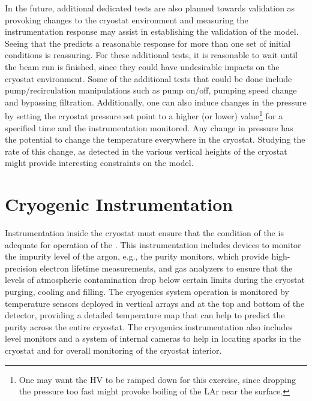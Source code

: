 In the future, additional dedicated tests are also planned towards  validation as provoking changes to the cryostat environment and measuring the instrumentation response may assist in establishing the validation of the  model. Seeing that the  predicts a reasonable response for more than one set of initial conditions is reassuring. For these additional tests, it is reasonable to wait until the beam run is finished, since they could have undesirable impacts on the cryostat environment. Some of the additional tests that could be done include pump/recirculation manipulations such as pump on/off, pumping speed change and bypassing filtration. Additionally, one can also induce changes in the pressure by setting the cryostat pressure set point to a higher (or lower) value\footnote{One may want the HV to be ramped down for this exercise, since dropping the pressure too fast might provoke boiling of the LAr near the
surface.} for a specified time and the instrumentation monitored. Any change in pressure has the potential to change the temperature everywhere in the cryostat. Studying the rate of this change, as
detected in the various vertical heights of the cryostat might provide interesting constraints on the  model. 


\section{Cryogenic Instrumentation}
\label{sec:fdgen-cryo-instr}
Instrumentation inside the cryostat must ensure that the condition of the  is adequate for operation of the .
This instrumentation includes devices to monitor the impurity level of the argon, e.g., the purity monitors, which provide high-precision electron lifetime measurements,
and gas analyzers to ensure that the levels of atmospheric contamination drop below certain limits during the cryostat purging, cooling and filling.
The cryogenics system operation is monitored by temperature sensors deployed in vertical arrays and at the top and bottom of the detector, providing a 
detailed \threed temperature map that can help to predict the  purity across the entire cryostat. The cryogenics instrumentation also includes \lar level monitors and
a system of internal cameras to help in locating sparks in the cryostat and for overall monitoring of the cryostat interior. 

